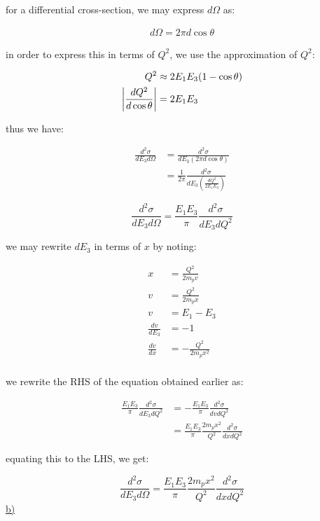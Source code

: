 \documentclass[11pt]{article}
\theoremstyle{definition}
\begin{document}
for a differential cross-section, we may express $d\Omega$ as:

\begin{align}
    d\Omega = 2\pi d \cos\theta
\end{align}

in order to express this in terms of $Q^2$, we use the approximation of $Q^2$:

\begin{align}
    Q^2 &\approx 2E_1E_3(1-\cos\theta)\\
    \absolutevalue{\frac{dQ^2}{d\cos\theta}} &= 2E_1E_3 
\end{align}

thus we have:

\begin{align}
    \frac{d^2\sigma}{dE_3d\Omega}
    &=
    \frac{d^2\sigma}{dE_3(2\pi d\cos\theta)}\\
    &= \frac{1}{2\pi}\frac{d^2\sigma}{dE_3\left(\frac{dQ^2}{2E_1E_3}\right)}
\end{align}

\begin{equation}
\boxed{
    \frac{d^2\sigma}{dE_3d\Omega}
    =
    \frac{E_1E_3}{\pi}\frac{d^2\sigma}{dE_3dQ^2}
}
\end{equation}

we may rewrite $dE_3$ in terms of $x$ by noting:

\begin{align}
    x &= \frac{Q^2}{2m_pv}\\
    v &= \frac{Q^2}{2m_px}\\
    v &= E_1-E_3\\
    \frac{dv}{dE_3} &= -1\\
    \frac{dv}{dx} &= -\frac{Q^2}{2m_px^2}\\
\end{align}

we rewrite the RHS of the equation obtained earlier as:

\begin{align}
    \frac{E_1E_3}{\pi}\frac{d^2\sigma}{dE_3dQ^2}
    &=
    -\frac{E_1E_3}{\pi}
    \frac{d^2\sigma}{dvdQ^2}\\
    &=
    \frac{E_1E_3}{\pi}
    \frac{2m_px^2}{Q^2}\frac{d^2\sigma}{dxdQ^2}
\end{align}

equating this to the LHS, we get:

\begin{equation}\label{part a final}
\boxed{
    \frac{d^2\sigma}{dE_3d\Omega}
    =
    \frac{E_1E_3}{\pi}
    \frac{2m_px^2}{Q^2}\frac{d^2\sigma}{dxdQ^2}
}
\end{equation}
\newpage
\underline{b)}
\end{document}
